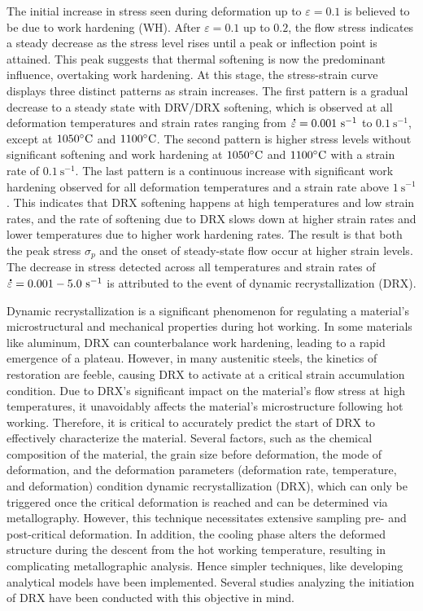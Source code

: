 \documentclass[metals,article,submit,pdftex,moreauthors]{Definitions/mdpi}
\DeclareRobustCommand{\mdot}[1]{\accentset{\mbox{\bfseries .}}{#1}}
\DeclareRobustCommand{\ps}{\text{s}^{-1}}
\begin{document}
The initial increase in stress seen during deformation up to $\varepsilon=0.1$ is believed to be due to work hardening (WH).
After $\varepsilon=0.1$ up to $0.2$, the flow stress indicates a steady decrease as the stress level rises until a peak or inflection point is attained.
This peak suggests that thermal softening is now the predominant influence, overtaking work hardening.
At this stage, the stress-strain curve displays three distinct patterns as strain increases.
The first pattern is a gradual decrease to a steady state with DRV/DRX softening, which is observed at all deformation temperatures and strain rates ranging from $\mdot\varepsilon=0.001~\ps$ to $0.1~\ps$, except at $1050\celsius$ and $1100\celsius$.
The second pattern is higher stress levels without significant softening and work hardening at $1050\celsius$ and $1100\celsius$ with a strain rate of $0.1~\ps$.
The last pattern is a continuous increase with significant work hardening observed for all deformation temperatures and a strain rate above $1~\ps$.
This indicates that DRX softening happens at high temperatures and low strain rates,
and the rate of softening due to DRX slows down at higher strain rates and lower temperatures due to higher work hardening rates.
The result is that both the peak stress $\sigma_p$ and the onset of steady-state flow occur at higher strain levels.
The decrease in stress detected across all temperatures and strain rates of $\mdot\varepsilon=0.001-5.0~\ps$ is attributed to the event of dynamic recrystallization (DRX).

Dynamic recrystallization is a significant phenomenon for regulating a material's microstructural and mechanical properties during hot working.
In some materials like aluminum, DRX can counterbalance work hardening, leading to a rapid emergence of a plateau.
However, in many austenitic steels, the kinetics of restoration are feeble, causing DRX to activate at a critical strain accumulation condition.
Due to DRX's significant impact on the material's flow stress at high temperatures, it unavoidably affects the material's microstructure following hot working.
Therefore, it is critical to accurately predict the start of DRX to effectively characterize the material.
Several factors, such as the chemical composition of the material, the grain size before deformation, the mode of deformation, and the deformation parameters (deformation rate, temperature, and deformation) condition dynamic recrystallization (DRX), which can only be triggered once the critical deformation is reached and can be determined via metallography.
However, this technique necessitates extensive sampling pre- and post-critical deformation.
In addition, the cooling phase alters the deformed structure during the descent from the hot working temperature, resulting in complicating metallographic analysis.
Hence simpler techniques, like developing analytical models have been implemented.
Several studies analyzing the initiation of DRX have been conducted with this objective in mind.
\end{document}
